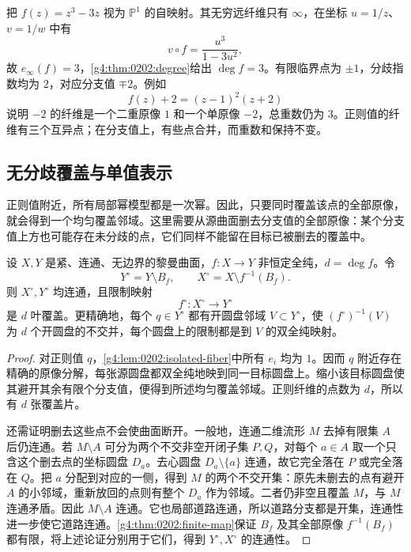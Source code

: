 \begin{example}\label{g4:exm:0202:cubic-fibers}
	把 \(f(z)=z^3-3z\) 视为 \(\mathbb P^1\) 的自映射。其无穷远纤维只有 \(\infty\)，在坐标 \(u=1/z\)、\(v=1/w\) 中有
	\[
		v\circ f=\frac{u^3}{1-3u^2},
	\]
	故 \(e_\infty(f)=3\)，\cref{g4:thm:0202:degree}给出 \(\deg f=3\)。有限临界点为 \(\pm1\)，分歧指数均为 \(2\)，对应分支值 \(\mp2\)。例如
	\[
		f(z)+2=(z-1)^2(z+2)
	\]
	说明 \(-2\) 的纤维是一个二重原像 \(1\) 和一个单原像 \(-2\)，总重数仍为 \(3\)。正则值的纤维有三个互异点；在分支值上，有些点合并，而重数和保持不变。
\end{example}

\subsection{无分歧覆盖与单值表示}
\label{g4:subsec:0202:04}
正则值附近，所有局部幂模型都是一次幂。因此，只要同时覆盖该点的全部原像，就会得到一个均匀覆盖邻域。这里需要从源曲面删去分支值的全部原像：某个分支值上方也可能存在未分歧的点，它们同样不能留在目标已被删去的覆盖中。

\begin{theorem}\label{g4:thm:0202:unbranched-cover}
	设 \(X,Y\) 是紧、连通、无边界的黎曼曲面，\(f:X\rightarrow Y\) 非恒定全纯，\(d=\deg f\)。令
	\[
		Y^\circ=Y\setminus B_f,\qquad
		X^\circ=X\setminus f^{-1}(B_f).
	\]
	则 \(X^\circ,Y^\circ\) 均连通，且限制映射
	\[
		f^\circ:X^\circ\longrightarrow Y^\circ
	\]
	是 \(d\) 叶覆盖。更精确地，每个 \(q\in Y^\circ\) 都有开圆盘邻域 \(V\subset Y^\circ\)，使 \((f^\circ)^{-1}(V)\) 为 \(d\) 个开圆盘的不交并，每个圆盘上的限制都是到 \(V\) 的双全纯映射。
\end{theorem}
\begin{proof}
	对正则值 \(q\)，\cref{g4:lem:0202:isolated-fiber}中所有 \(e_i\) 均为 \(1\)。因而 \(q\) 附近存在精确的原像分解，每张源圆盘都双全纯地映到同一目标圆盘上。缩小该目标圆盘使其避开其余有限个分支值，便得到所述均匀覆盖邻域。正则纤维的点数为 \(d\)，所以有 \(d\) 张覆盖片。

	还需证明删去这些点不会使曲面断开。一般地，连通二维流形 \(M\) 去掉有限集 \(A\) 后仍连通。若 \(M\setminus A\) 可分为两个不交非空开闭子集 \(P,Q\)，对每个 \(a\in A\) 取一个只含这个删去点的坐标圆盘 \(D_a\)。去心圆盘 \(D_a\setminus\{a\}\) 连通，故它完全落在 \(P\) 或完全落在 \(Q\)。把 \(a\) 分配到对应的一侧，得到 \(M\) 的两个不交开集：原先未删去的点有避开 \(A\) 的小邻域，重新放回的点则有整个 \(D_a\) 作为邻域。二者仍非空且覆盖 \(M\)，与 \(M\) 连通矛盾。因此 \(M\setminus A\) 连通。它也局部道路连通，所以道路分支都是开集，连通性进一步使它道路连通。\cref{g4:thm:0202:finite-map}保证 \(B_f\) 及其全部原像 \(f^{-1}(B_f)\) 都有限，将上述论证分别用于它们，得到 \(Y^\circ,X^\circ\) 的连通性。
\end{proof}

